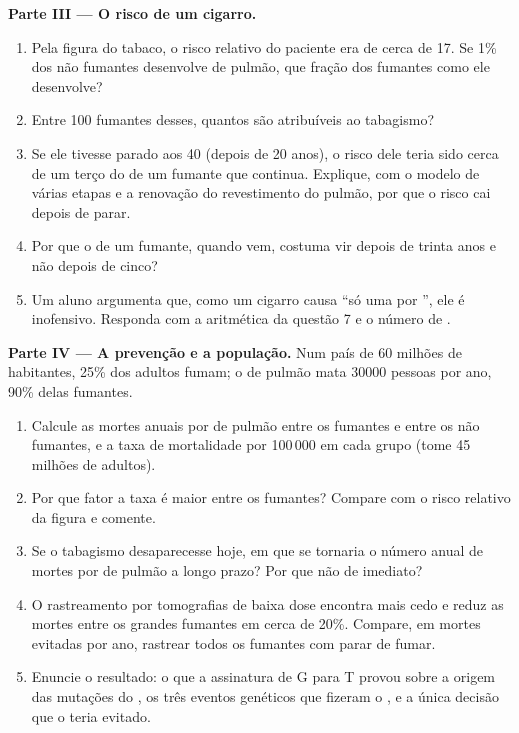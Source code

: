 \begin{problem}
\medskip
\noindent\textbf{Parte III --- O risco de um cigarro.}
\begin{enumerate}[resume]
  \item Pela figura do tabaco, o risco relativo do paciente era de
        cerca de 17. Se 1\% dos não fumantes desenvolve  de
        pulmão, que fração dos fumantes como ele desenvolve?
  \item Entre 100 fumantes desses, quantos  são atribuíveis ao
        tabagismo?
  \item Se ele tivesse parado aos 40 (depois de 20 anos), o risco dele
        teria sido cerca de um terço do de um fumante que continua.
        Explique, com o modelo de várias etapas e a renovação do
        revestimento do pulmão, por que o risco cai depois de parar.
  \item Por que o  de um fumante, quando vem, costuma vir depois
        de trinta anos e não depois de cinco?
  \item Um aluno argumenta que, como um cigarro causa ``só uma 
        por '', ele é inofensivo. Responda com a aritmética da
        questão 7 e o número de .
\end{enumerate}

\medskip
\noindent\textbf{Parte IV --- A prevenção e a população.}
Num país de 60 milhões de habitantes, 25\% dos adultos fumam; o 
de pulmão mata $\num{30000}$ pessoas por ano, 90\% delas fumantes.
\begin{enumerate}[resume]
  \item Calcule as mortes anuais por  de pulmão entre os
        fumantes e entre os não fumantes, e a taxa de mortalidade por
        100\,000 em cada grupo (tome 45 milhões de adultos).
  \item Por que fator a taxa é maior entre os fumantes? Compare com o
        risco relativo da figura e comente.
  \item Se o tabagismo desaparecesse hoje, em que se tornaria o número
        anual de mortes por  de pulmão a longo prazo? Por que não
        de imediato?
  \item O rastreamento por tomografias de baixa dose encontra 
        mais cedo e reduz as mortes entre os grandes fumantes em cerca
        de 20\%. Compare, em mortes evitadas por ano, rastrear todos os
        fumantes com parar de fumar.
  \item Enuncie o resultado: o que a assinatura de G para T provou
        sobre a origem das mutações do , os três eventos genéticos
        que fizeram o , e a única decisão que o teria evitado.
\end{enumerate}
\end{problem}
